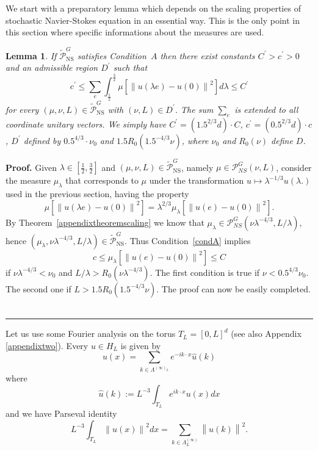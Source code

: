 \documentclass[11pt]{preprint}
\newtheorem{lemma}[theorem]{Lemma}
\newenvironment{proof}[1][Proof]{\textbf{#1.} }{\ \rule{0.5em}{0.5em}}
\begin{document}
We start with a preparatory lemma which depends on the scaling properties of stochastic Navier-Stokes equation in an essential way. This is the only point in this section where specific informations about the measures are used.

\begin{lemma}
\label{lemmalambda}If $\tilde{\mathcal{P}}_{{\mathrm{NS}}}^{G}$ satisfies
Condition~$A$ then there exist constants $C^{\prime}>c^{\prime}>0$ and an
admissible region $D^{\prime}$ such that
\[
c^{\prime}\leq\sum_{e}\int_{\frac{1}{2}}^{\frac{3}{2}}\mu\left[  \left\|
u\left(  \lambda e\right)  -u(0)\right\|  ^{2}\right]  d\lambda\leq C^{\prime}%
\]
for every $(\mu,\nu,L)\in\tilde{\mathcal{P}}_{{\mathrm{NS}}}^{G}$ with
$(\nu,L)\in D^{\prime}$. The sum $\sum_{e}$ is extended to all coordinate
unitary vectors. We simply have $C^{\prime}=\left(  1.5^{2/3}d\right)  \cdot
C$, $c^{\prime}=\left(  0.5^{2/3}d\right)  \cdot c$, $D^{\prime}$ defined by
$0.5^{4/3}\cdot\nu_{0}$ and $1.5R_{0}\left(  1.5^{-4/3}\nu\right)  $, where
$\nu_{0}$ and $R_{0}\left(  \nu\right)  $ define $D$.
\end{lemma}

\begin{proof}
Given $\lambda\in\left[  \frac{1}{2},\frac{3}{2}\right]  $ and $(\mu,\nu
,L)\in\tilde{\mathcal{P}}_{{\mathrm{NS}}}^{G}$, namely $\mu\in\mathcal{P}%
_{NS}^{G}\left(  \nu,L\right)  $, consider the measure $\mu_{\lambda}$ that
corresponds to $\mu$ under the transformation $u\mapsto\lambda^{-1/3}%
u(\lambda.)$ used in the previous section, having the property
\[
\mu\left[  \left\|  u\left(  \lambda e\right)  -u(0)\right\|  ^{2}\right]
=\lambda^{2/3}\mu_{\lambda}\left[  \left\|  u\left(  e\right)  -u(0)\right\|
^{2}\right]  .
\]
By Theorem~\ref{appendixtheoremscaling} we know that $\mu_{\lambda}%
\in\mathcal{P}_{NS}^{G}\left(  \nu\lambda^{-4/3},L/\lambda\right)  $, hence
$(\mu_{\lambda},\nu\lambda^{-4/3},L/\lambda)\in\tilde{\mathcal{P}%
}_{{\mathrm{NS}}}^{G}$. Thus Condition~\ref{condA} implies
\[
c\leq\mu_{\lambda}\left[  \left\|  u\left(  e\right)  -u(0)\right\|
^{2}\right]  \leq C
\]
if $\nu\lambda^{-4/3}<\nu_{0}$ and $L/\lambda>R_{0}\left(  \nu\lambda
^{-4/3}\right)  $. The first condition is true if $\nu<0.5^{4/3}\nu_{0}$. The
second one if $L>1.5R_{0}\left(  1.5^{-4/3}\nu\right)  $. The proof can now be
easily completed.
\end{proof}

Let us use some Fourier analysis on the torus $T_{L}=\left[  0,L\right]  ^{d}%
$ (see also Appendix \ref{appendixtwo}). Every $u\in H_{L}$ is given by
\[
u\left(  x\right)  =\sum_{k\in\Lambda^{\left(  \infty\right)_L  }%
}e^{-ik\cdot x}\widehat{u}\left(  k\right)
\]
where
\[
\widehat{u}\left(  k\right)  :=L^{-3}\int_{T_{L}}e^{ik\cdot x}u\left(
x\right)  dx
\]
and we have Parseval identity
\[
L^{-3}\int_{T_{L}}\left\|  u\left(  x\right)  \right\|  ^{2}dx=\sum
_{k\in\Lambda^{\left(  \infty\right)}_L}\left\|  \widehat{u}\left(
k\right)  \right\|  ^{2}.
\]
\end{document}
